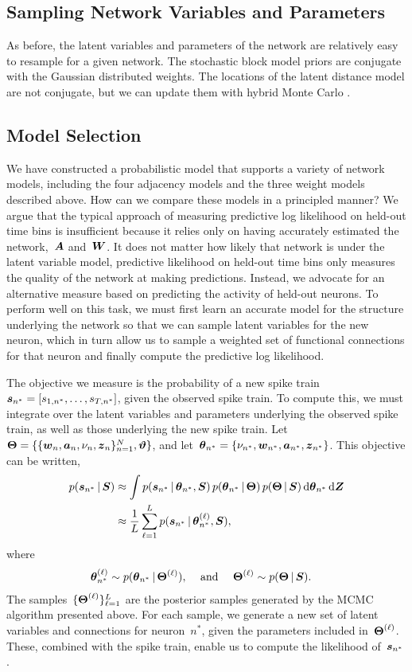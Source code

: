 \subsection{Sampling Network Variables and Parameters}
As before, the latent variables and parameters of the network are relatively 
easy to resample for a given network. The stochastic block model priors are 
conjugate with the Gaussian distributed weights. The locations of the latent 
distance model are not conjugate, but we can update them with hybrid Monte Carlo
\citep{Neal10}.

\subsection{Model Selection}
We have constructed a probabilistic model that supports a variety
of network models, including the four adjacency models and the three
weight models described above. How can we compare these models in
a principled manner? We argue that the typical approach of measuring
predictive log likelihood on held-out time bins is insufficient because
it relies only on having accurately estimated the network,~$\boldsymbol{A}$ and~$\boldsymbol{W}$.
It does not matter how likely that network is under the latent variable
model, predictive likelihood on held-out time bins only measures the
quality of the network at making predictions. Instead, we advocate
for an alternative measure based on predicting the activity of held-out
neurons. To perform well on this task, we must first learn an accurate
model for the structure underlying the network so that we can
sample latent variables for the new neuron, which in turn allow us to
sample a weighted set of functional connections for that neuron and
finally compute the predictive log likelihood.

The objective we measure is the probability of a new spike
train~$\boldsymbol{s}_{n^*}=[s_{1,n^*}, \ldots, s_{T,n^*}]$, given the
observed spike train. To compute this, we must integrate
over the latent variables and parameters underlying the
observed spike train, as well as those underlying the
new spike train. 
Let~$\boldsymbol{\Theta} = \{\{\boldsymbol{w}_n, \boldsymbol{a}_n, \nu_n, \boldsymbol{z}_n\}_{n=1}^N, \boldsymbol{\vartheta}\}$, and
let~$\boldsymbol{\theta}_{n^*} = \{\nu_{n^*}, \boldsymbol{w}_{n^*}, \boldsymbol{a}_{n^*}, \boldsymbol{z}_{n^*}\}$.
This objective can be written,
\begin{align*}
  p(\boldsymbol{s}_{n^*} \,|\, \boldsymbol{S}) &\approx
  \int p(\boldsymbol{s}_{n^*} \,|\, \boldsymbol{\theta}_{n^*}, \boldsymbol{S}) \, p(\boldsymbol{\theta}_{n^*} \,|\, \boldsymbol{\Theta}) \, p(\boldsymbol{\Theta} \,|\, \boldsymbol{S}) \,
  \mathrm{d} \boldsymbol{\theta}_{n^*} \, \mathrm{d} \boldsymbol{Z} \\
  &\approx
  \frac{1}{L} \sum_{\ell=1}^L p(\boldsymbol{s}_{n^*} \,|\, \boldsymbol{\theta}_{n^*}^{(\ell)}, \boldsymbol{S}),
\end{align*}
where
\begin{align*}
  \boldsymbol{\theta}_{n^*}^{(\ell)} &\sim p(\boldsymbol{\theta}_{n^*} \,|\, \boldsymbol{\Theta}^{(\ell)}),
  &\text{ and }& & 
  \boldsymbol{\Theta}^{(\ell)} &\sim p(\boldsymbol{\Theta} \,|\, \boldsymbol{S}).
\end{align*}
The samples~$\{\boldsymbol{\Theta}^{(\ell)}\}_{\ell=1}^L$ are the posterior samples generated
by the MCMC algorithm presented above. For each sample, we
generate a new set of latent variables and connections for neuron~$n^*$,
given the parameters included in~$\boldsymbol{\Theta}^{(\ell)}$. These, combined with
the spike train, enable us to compute the likelihood of~$\boldsymbol{s}_{n^*}$.

